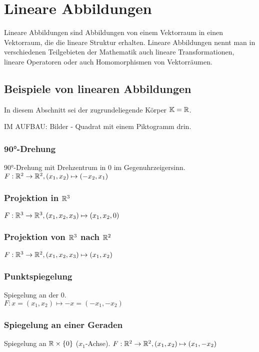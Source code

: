 \section{Lineare Abbildungen}

Lineare Abbildungen sind Abbildungen von einem Vektorraum in einen Vektorraum, die die lineare Struktur erhalten. Lineare Abbildungen nennt man in verschiedenen Teilgebieten der Mathematik auch lineare Transformationen, lineare Operatoren oder auch Homomorphismen von Vektorräumen.  

\subsection{Beispiele von linearen Abbildungen}
In diesem Abschnitt sei der zugrundeliegende Körper $ \mathbb K = \mathbb R $.

IM AUFBAU: Bilder - Quadrat mit einem Piktogramm drin. 

\subsubsection{90°-Drehung}
	90°-Drehung mit Drehzentrum in $ 0 $ im Gegenuhrzeigersinn.\\
	$ F: \mathbb R^2 \to \mathbb R^2, (x_1,x_2) \mapsto (-x_2,x_1) $
	
\subsubsection{Projektion in $ \mathbb R^3 $}
	$ F : \mathbb R^3 \to \mathbb R^3, (x_1,x_2,x_3) \mapsto (x_1, x_2, 0) $

\subsubsection{Projektion von $ \mathbb R^3 $  nach $ \mathbb R^2 $ }
	$ F : \mathbb R^3 \to \mathbb R^2, (x_1,x_2,x_3) \mapsto (x_1, x_2) $

\subsubsection{Punktspiegelung}
	Spiegelung an der $ 0 $.\\
	$ F : x = (x_1, x_2) \mapsto -x = (-x_1, -x_2) $
	
\subsubsection{Spiegelung an einer Geraden}
	Spiegelung an $ \mathbb R \times \{0\} $ ($ x_1 $-Achse).
	$ F: \mathbb R^2 \to \mathbb R^2, (x_1, x_2) \mapsto (x_1, -x_2) $

